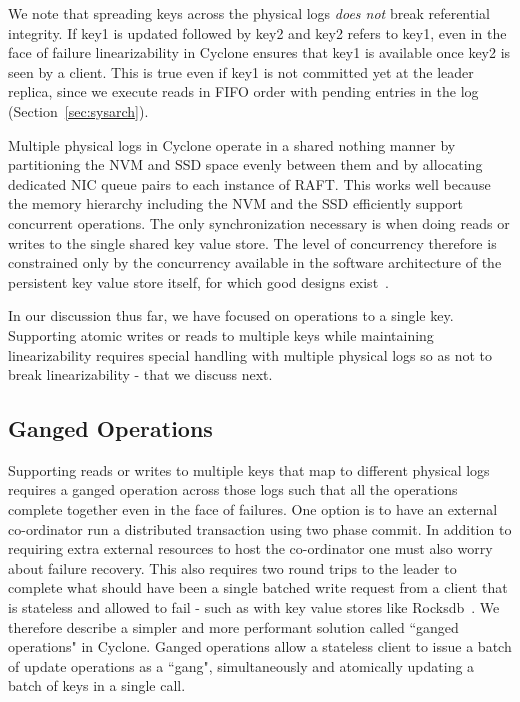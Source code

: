\documentclass[pageno]{jpaper}
\begin{document}
We note that spreading keys across the physical logs \emph{does not} break
referential integrity. If key1 is updated followed by key2 and key2 refers to
key1, even in the face of failure linearizability in Cyclone ensures that key1
is available once key2 is seen by a client. This is true even if key1 is not
committed yet at the leader replica, since we execute reads in FIFO order with
pending entries in the log (Section~\ref{sec:sysarch}).

Multiple physical logs in Cyclone operate in a shared nothing manner by
partitioning the NVM and SSD space evenly between them and by allocating
dedicated NIC queue pairs to each instance of RAFT. This works well because the
memory hierarchy including the NVM and the SSD efficiently support concurrent
operations. The only synchronization necessary is when doing reads or writes to
the single shared key value store.  The level of concurrency therefore is
constrained only by the concurrency available in the software architecture of
the persistent key value store itself, for which good designs
exist~\cite{flodb}.

In our discussion thus far, we have focused on operations to a single
key. Supporting atomic writes or reads to multiple keys while maintaining
linearizability requires special handling with multiple physical logs so as not
to break linearizability - that we discuss next.

\subsection{Ganged Operations}
Supporting reads or writes to multiple keys that map to different physical logs
requires a ganged operation across those logs such that all the operations
complete together even in the face of failures. One option is to have an
external co-ordinator run a distributed transaction using two phase commit. In
addition to requiring extra external resources to host the co-ordinator one must
also worry about failure recovery. This also requires two round trips to the
leader to complete what should have been a single batched write request from a
client that is stateless and allowed to fail - such as with key value stores
like Rocksdb~\cite{rocksdb}. We therefore describe a simpler and more performant
solution called ``ganged operations" in Cyclone. Ganged operations allow a
stateless client to issue a batch of update operations as a ``gang",
simultaneously and atomically updating a batch of keys in a single call.
\end{document}
